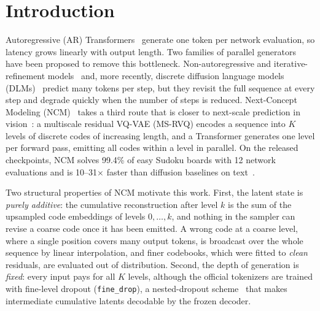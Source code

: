 \section{Introduction}
Autoregressive (AR) Transformers~\citep{vaswani2017attention,radford2019language,brown2020language} generate one token per network evaluation, so latency grows linearly with output length. Two families of parallel generators have been proposed to remove this bottleneck. Non-autoregressive and iterative-refinement models~\citep{gu2018nat,lee2018deterministic,ghazvininejad2019maskpredict,gu2019levenshtein} and, more recently, discrete diffusion language models (DLMs)~\citep{austin2021d3pm,li2022diffusionlm,lou2024sedd,sahoo2024mdlm,shi2024md4,gulrajani2023plaid,nie2025llada} predict many tokens per step, but they revisit the full sequence at every step and degrade quickly when the number of steps is reduced. Next-Concept Modeling (NCM)~\citep{kumbong2026ncm} takes a third route that is closer to next-scale prediction in vision~\citep{tian2024var}: a multiscale residual VQ-VAE (MS-RVQ) encodes a sequence into $K$ levels of discrete codes of increasing length, and a Transformer generates one level per forward pass, emitting all codes within a level in parallel. On the released checkpoints, NCM solves 99.4\% of easy Sudoku boards with 12 network evaluations and is 10--31$\times$ faster than diffusion baselines on text~\citep{kumbong2026ncm}.

Two structural properties of NCM motivate this work. First, the latent state is \emph{purely additive}: the cumulative reconstruction after level $k$ is the sum of the upsampled code embeddings of levels $0,\dots,k$, and nothing in the sampler can revise a coarse code once it has been emitted. A wrong code at a coarse level, where a single position covers many output tokens, is broadcast over the whole sequence by linear interpolation, and finer codebooks, which were fitted to \emph{clean} residuals, are evaluated out of distribution. Second, the depth of generation is \emph{fixed}: every input pays for all $K$ levels, although the official tokenizers are trained with fine-level dropout (\texttt{fine\_drop}), a nested-dropout scheme~\citep{rippel2014nested} that makes intermediate cumulative latents decodable by the frozen decoder.

